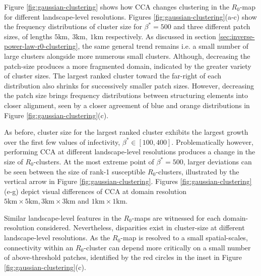 Figure \ref{fig:gaussian-clustering} shows how CCA changes clustering in the $R_0$-map for different landscape-level resolutions.
Figures \ref{fig:gaussian-clustering}(a-c) show the frequency distributions of cluster size for $\beta^*=500$ and three different patch sizes, of lengths $\mathrm{5km,\ 3km,\ 1km}$ respectively.
As discussed in section \ref{sec:inverse-power-law-r0-clustering}, the same general trend remains i.e. a small number of large clusters alongside more numerous small clusters.
Although, decreasing the patch-size produces a more fragmented domain, indicated by the greater variety of cluster sizes.
The largest ranked cluster toward the far-right of each distribution also shrinks for successively smaller patch sizes.
However, decreasing the patch size brings frequency distributions between structuring elements into closer alignment, seen by a closer agreement of blue and orange distributions in Figure \ref{fig:gaussian-clustering}(c).

As before, cluster size for the largest ranked cluster exhibits the largest growth over the first few values of infectivity, $\beta^* \in [100, 400]$.
Problematically however, performing CCA at different landscape-level resolutions produces a change in the size of $R_0$-clusters.
At the most extreme point of $\beta^*=500$, larger deviations can be seen between the size of rank-1 susceptible $R_0$-clusters, illustrated by the vertical arrow in Figure \ref{fig:gaussian-clustering}.
Figures \ref{fig:gaussian-clustering}(e-g) depict visual differences of CCA at domain resolution $\mathrm{5km \times 5km, 3km\times 3km}$ and $\mathrm{1km\times 1km}$.

Similar landscape-level features in the $R_0$-maps are witnessed for each domain-resolution considered.
Nevertheless, disparities exist in cluster-size at different landscape-level resolutions.
As the $R_0$-map is resolved to a small spatial-scales, connectivity within an $R_0$-cluster can depend more critically on a small number of above-threshold patches, identified by the red circles in the inset in Figure \ref{fig:gaussian-clustering}(c).

